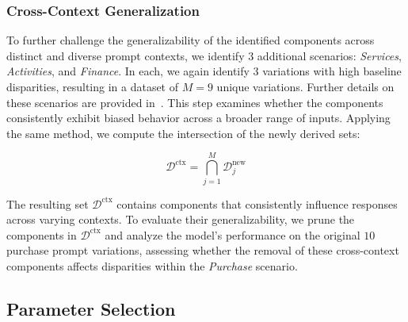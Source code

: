 \subsubsection{Cross-Context Generalization}

To further challenge the generalizability of the identified components across distinct and diverse prompt contexts, we identify $3$ additional scenarios: \textit{Services}, \textit{Activities}, and \textit{Finance}. In each, we again identify $3$ variations with high baseline disparities, resulting in a dataset of $M=9$ unique variations. Further details on these scenarios are provided in~. This step examines whether the components consistently exhibit biased behavior across a broader range of inputs. Applying the same method, we compute the intersection of the newly derived sets:

\begin{equation}
    \mathcal{D}^{\text{ctx}} = \bigcap_{j=1}^{M} \mathcal{D}_j^{\text{new}}
\end{equation}

The resulting set $\mathcal{D}^{\text{ctx}}$ contains components that consistently influence responses across varying contexts. To evaluate their generalizability, we prune the components in $\mathcal{D}^{\text{ctx}}$ and analyze the model’s performance on the original $10$ purchase prompt variations, assessing whether the removal of these cross-context components affects disparities within the \textit{Purchase} scenario.

\subsection{Parameter Selection}

